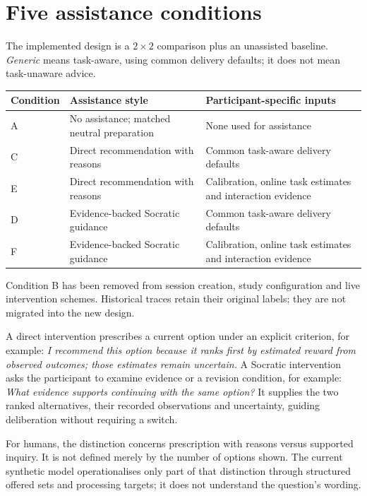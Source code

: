 \documentclass[11pt,a4paper]{article}
\begin{document}
\section{Five assistance conditions}
The implemented design is a $2\times2$ comparison plus an unassisted baseline. \emph{Generic} means task-aware, using common delivery defaults; it does not mean task-unaware advice.

\begin{center}
\small
\begin{tabularx}{\linewidth}{@{}lYY@{}}
\toprule
Condition & Assistance style & Participant-specific inputs\\
\midrule
A & No assistance; matched neutral preparation & None used for assistance\\
C & Direct recommendation with reasons & Common task-aware delivery defaults\\
E & Direct recommendation with reasons & Calibration, online task estimates and interaction evidence\\
D & Evidence-backed Socratic guidance & Common task-aware delivery defaults\\
F & Evidence-backed Socratic guidance & Calibration, online task estimates and interaction evidence\\
\bottomrule
\end{tabularx}
\end{center}

Condition B has been removed from session creation, study configuration and live intervention schemes. Historical traces retain their original labels; they are not migrated into the new design.

A direct intervention prescribes a current option under an explicit criterion, for example: \emph{I recommend this option because it ranks first by estimated reward from observed outcomes; those estimates remain uncertain.} A Socratic intervention asks the participant to examine evidence or a revision condition, for example: \emph{What evidence supports continuing with the same option?} It supplies the two ranked alternatives, their recorded observations and uncertainty, guiding deliberation without requiring a switch.

For humans, the distinction concerns prescription with reasons versus supported inquiry. It is not defined merely by the number of options shown. The current synthetic model operationalises only part of that distinction through structured offered sets and processing targets; it does not understand the question's wording.
\end{document}
